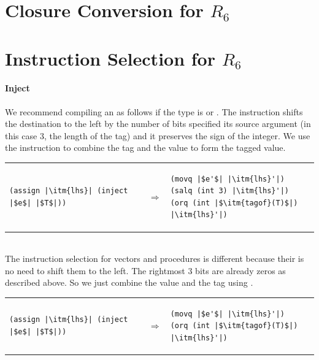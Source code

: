 \documentclass[11pt]{book}
\begin{document}
\section{Closure Conversion for $R_6$}
\label{sec:closure-conversion-R6}



\section{Instruction Selection for $R_6$}
\label{sec:select-r6}

\paragraph{Inject}

We recommend compiling an  as follows if the type is
 or .  The  instruction shifts the
destination to the left by the number of bits specified its source
argument (in this case $3$, the length of the tag) and it preserves
the sign of the integer. We use the  instruction to combine
the tag and the value to form the tagged value.  \\
\begin{tabular}{lll}
\begin{minipage}{0.4\textwidth}
\begin{lstlisting}
(assign |\itm{lhs}| (inject |$e$| |$T$|))
\end{lstlisting}
\end{minipage}
&
$\Rightarrow$
&
\begin{minipage}{0.5\textwidth}
\begin{lstlisting}
(movq |$e'$| |\itm{lhs}'|)
(salq (int 3) |\itm{lhs}'|)
(orq (int |$\itm{tagof}(T)$|) |\itm{lhs}'|)
\end{lstlisting}
\end{minipage}
\end{tabular}  \\
The instruction selection for vectors and procedures is different
because their is no need to shift them to the left. The rightmost 3
bits are already zeros as described above. So we just combine the
value and the tag using .  \\
\begin{tabular}{lll}
\begin{minipage}{0.4\textwidth}
\begin{lstlisting}
(assign |\itm{lhs}| (inject |$e$| |$T$|))
\end{lstlisting}
\end{minipage}
&
$\Rightarrow$
&
\begin{minipage}{0.5\textwidth}
\begin{lstlisting}
(movq |$e'$| |\itm{lhs}'|)
(orq (int |$\itm{tagof}(T)$|) |\itm{lhs}'|)
\end{lstlisting}
\end{minipage}
\end{tabular} 
\end{document}
